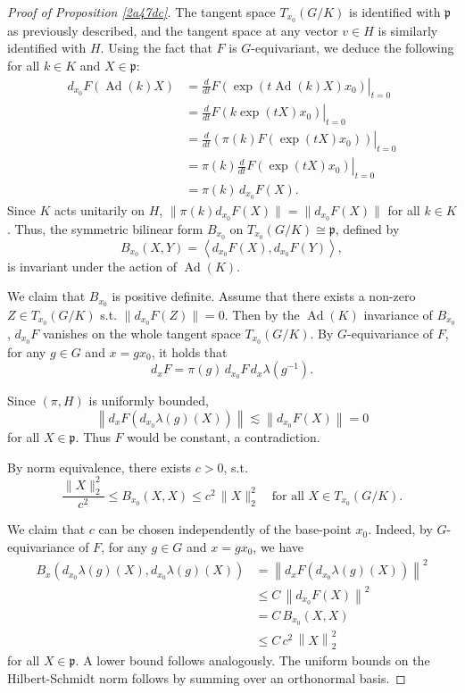 \documentclass[10pt,a4paper]{amsart}
\begin{document}
\begin{proof}[Proof of Proposition \ref{2a47dc}]
The tangent space \(T_{x_0}(G / K)\) is identified with \(\mathfrak{p}\)
as previously described, and the tangent space at any vector \(v \in H\)
is similarly identified with \(H\). Using the fact that \(F\) is
\(G\)-equivariant, we deduce the following for all \(k \in K\) and
\(X \in \mathfrak{p}\): \[
\begin{aligned}
d_{x_{0}} F(\operatorname{Ad}(k) X) & =\left.\frac{d}{d t} F\left(\exp(t \operatorname{Ad}(k) X) x_0\right)\right|_{t=0} \\
& =\left.\frac{d}{d t} F\left(k \exp(t X) x_0\right)\right|_{t=0} \\
& =\left.\frac{d}{d t}\left(\pi(k) F\left(\exp(t X) x_0\right)\right)\right|_{t=0} \\
& =\pi(k) \left.\frac{d}{d t} F\left(\exp(t X) x_0\right)\right|_{t=0} \\
& =\pi(k) \, d_{x_{0}} F(X).
\end{aligned}
\] Since \(K\) acts unitarily on \(H\),
\(\|\pi(k)d_{x_{0}} F(X)\| = \|d_{x_{0}} F(X)\|\) for all \(k \in K\).
Thus, the symmetric bilinear form \(B_{x_{0}}\) on
\(T_{x_0}(G / K) \cong \mathfrak{p}\), defined by \[
B_{x_{0}}(X, Y) = \left\langle d_{x_{0}} F(X), d_{x_{0}} F(Y) \right\rangle,
\] is invariant under the action of \(\operatorname{Ad}(K)\).

We claim that \(B_{x_{0}}\) is positive definite. Assume that there
exists a non-zero \(Z \in T_{x_{0}}(G/K)\) s.t.
\(\|d_{x_{0}}F(Z)\| = 0\). Then by the \(\operatorname{Ad}(K)\)
invariance of \(B_{x_{0}}\), \(d_{x_{0}}F\) vanishes on the whole
tangent space \(T_{x_{0}}(G/K)\). By \(G\)-equivariance of \(F\), for
any \(g \in G\) and \(x = g x_0\), it holds that \begin{equation}
\label{9e84cd}
d_{x} F = \pi(g) \,d_{x_{0}} F\,d_{x} \lambda\left(g^{-1}\right).\end{equation}

Since \((\pi,H)\) is uniformly bounded,
\[\left\|d_{x} F\left(d_{x_{0}} \lambda(g) (X)\right)\right\| \lesssim \left\|d_{x_{0}} F(X)\right\| = 0\]
for all \(X \in \mathfrak{p}\). Thus \(F\) would be constant, a
contradiction.

By norm equivalence, there exists \(c > 0\), s.t.
\[\frac{\|X\|_{2}^2}{c^{2}}\leq B_{x_{0}}(X,X) \leq c^{2} \,\|X\|_{2}^2 \quad \text{for all } X \in T_{x_0}(G / K).\]

We claim that \(c\) can be chosen independently of the base-point
\(x_{0}\). Indeed, by \(G\)-equivariance of \(F\), for any \(g \in G\)
and \(x = g x_0\), we have \[
\begin{aligned}
B_{x}(d_{x_{0}} \lambda(g) (X),d_{x_{0}} \lambda(g) (X) )
&=\left\|d_{x} F\left(d_{x_{0}} \lambda(g) (X)\right)\right\|^{2} \\
& \leq C \, \left\|d_{x_{0}} F(X)\right\|^{2} \\
& = C \, B_{x_{0}}(X,X) \\
& \leq C\,c^{2} \, \left\|X\right\|_2^{2}
\end{aligned}
\] for all \(X \in \mathfrak{p}\). A lower bound follows analogously.
The uniform bounds on the Hilbert-Schmidt norm follows by summing over
an orthonormal basis.

\end{proof}
\end{document}
